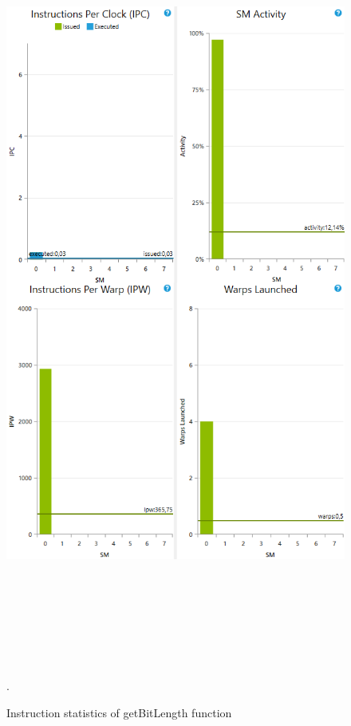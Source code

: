 \documentclass[oneside,openright,12pt,final,en]{mgr}
\begin{document}
\begin{figure}[H]
	\centering
	\includegraphics[width=\textwidth, height=26cm,keepaspectratio]{bitlength_instructions}.
	\caption{Instruction statistics of getBitLength function}
	\label{fig:bitlength_instructions}
\end{figure}
\end{document}
